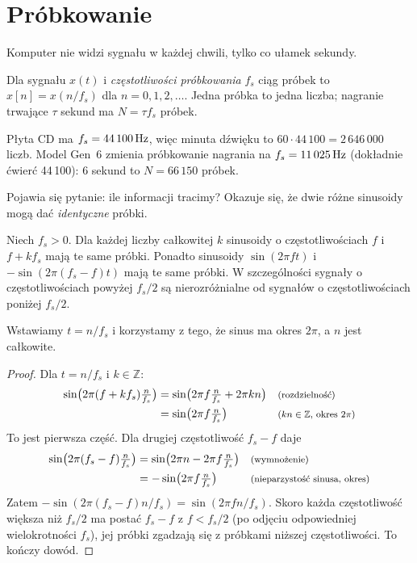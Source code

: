 \section{Próbkowanie}

Komputer nie widzi sygnału w każdej chwili, tylko co ułamek sekundy.

\begin{definicja}[Próbkowanie]\label{def:probkowanie}
Dla sygnału $x(t)$ i \emph{częstotliwości próbkowania} $f_s$ ciąg próbek to $x[n]=x(n/f_s)$ dla $n=0,1,2,\dots$.
Jedna próbka to jedna liczba; nagranie trwające $\tau$ sekund ma $N=\tau f_s$ próbek.
\end{definicja}

\begin{przyklad}\label{prz:probkowanie}
Płyta CD ma $f_s=44\,100\,\mathrm{Hz}$, więc minuta dźwięku to $60\cdot 44\,100=2\,646\,000$ liczb. Model Gen~6 zmienia
próbkowanie nagrania na $f_s=11\,025\,\mathrm{Hz}$ (dokładnie ćwierć 44\,100): 6 sekund to $N=66\,150$ próbek.
\end{przyklad}

Pojawia się pytanie: ile informacji tracimy? Okazuje się, że dwie różne sinusoidy mogą dać \emph{identyczne} próbki.

\begin{twierdzenie}[Aliasing]\label{tw:aliasing}
Niech $f_s>0$. Dla każdej liczby całkowitej $k$ sinusoidy o częstotliwościach $f$ i $f+kf_s$ mają te same próbki.
Ponadto sinusoidy $\sin(2\pi f t)$ i $-\sin(2\pi (f_s-f)t)$ mają te same próbki. W szczególności sygnały
o częstotliwościach powyżej $f_s/2$ są nierozróżnialne od sygnałów o częstotliwościach poniżej $f_s/2$.
\end{twierdzenie}
\begin{pomyslDowodu}
Wstawiamy $t=n/f_s$ i korzystamy z tego, że sinus ma okres $2\pi$, a $n$ jest całkowite.
\end{pomyslDowodu}
\begin{proof}
Dla $t=n/f_s$ i $k\in\mathbb Z$:
\begin{align*}
\sin\!\big(2\pi (f+kf_s)\tfrac{n}{f_s}\big)
  &= \sin\!\big(2\pi f\tfrac{n}{f_s}+2\pi kn\big) && \text{\footnotesize (rozdzielność)}\\
  &= \sin\!\big(2\pi f\tfrac{n}{f_s}\big) && \text{\footnotesize ($kn\in\mathbb Z$, okres $2\pi$)}
\end{align*}
To jest pierwsza część. Dla drugiej częstotliwość $f_s-f$ daje
\begin{align*}
\sin\!\big(2\pi (f_s-f)\tfrac{n}{f_s}\big)
  &= \sin\!\big(2\pi n-2\pi f\tfrac{n}{f_s}\big) && \text{\footnotesize (wymnożenie)}\\
  &= -\sin\!\big(2\pi f\tfrac{n}{f_s}\big) && \text{\footnotesize (nieparzystość sinusa, okres)}
\end{align*}
Zatem $-\sin(2\pi(f_s-f)n/f_s)=\sin(2\pi fn/f_s)$. Skoro każda częstotliwość większa niż $f_s/2$ ma postać
$f_s-f$ z $f<f_s/2$ (po odjęciu odpowiedniej wielokrotności $f_s$), jej próbki zgadzają się z próbkami
niższej częstotliwości. To kończy dowód.
\end{proof}

